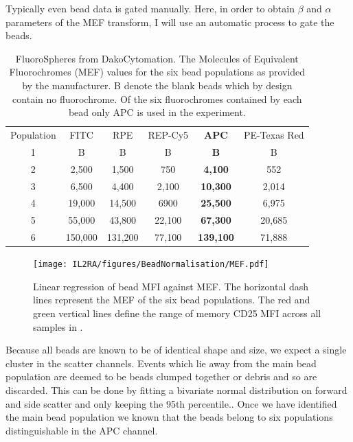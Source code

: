 Typically even bead data is gated manually.
Here, in order to obtain $\beta$ and $\alpha$ parameters of the MEF transform, I will use an automatic process to gate the beads.

\begin{table} [hb]
\begin{center}
\begin{tabular} {|c c c c c c|}
\cline{1-6}
Population & FITC & RPE & REP-Cy5 & \textbf{APC} & PE-Texas Red\\
\cline{1-6}
1 & B & B & B & \textbf{B} & B \\
2 & 2,500 & 1,500 & 750 & \textbf{4,100} & 552\\
3 & 6,500 & 4,400 & 2,100 & \textbf{10,300} & 2,014\\
4 & 19,000 & 14,500 & 6900 & \textbf{25,500} & 6,975\\
5 & 55,000 & 43,800 & 22,100 & \textbf{67,300} & 20,685\\
6 & 150,000 & 131,200 & 77,100 & \textbf{139,100} & 71,888\\
\cline{1-6}
\end{tabular}
\end{center}
\caption{ \label{table:fluorospheres} FluoroSpheres from DakoCytomation. 
    The Molecules of Equivalent Fluorochromes (MEF) values for the six bead populations as provided by the manufacturer.
    B denote the blank beads which by design contain no fluorochrome.
    Of the six fluorochromes contained by each bead only APC is used in the experiment.
 }
\end{table}

\begin{figure}[hb]
    \centering
    \texttt{[image: IL2RA/figures/BeadNormalisation/MEF.pdf]}
    \caption{ Linear regression of bead MFI against MEF. The horizontal dash lines represent the MEF of the six bead populations.
    The red and green vertical lines define the range of memory CD25 MFI across all samples in \citet{Dendrou:2009dv}. }
    \label{figure:mef}
\end{figure}



Because all beads are known to be of identical shape and size, we expect a single cluster in the scatter channels.
Events which lie away from the main bead population are deemed to be beads clumped together or debris and so are discarded.
This can be done by fitting a bivariate normal distribution on forward and side scatter and only keeping the 95th percentile..
Once we have identified the main bead population we known that the beads belong to six populations distinguishable in the APC channel.

